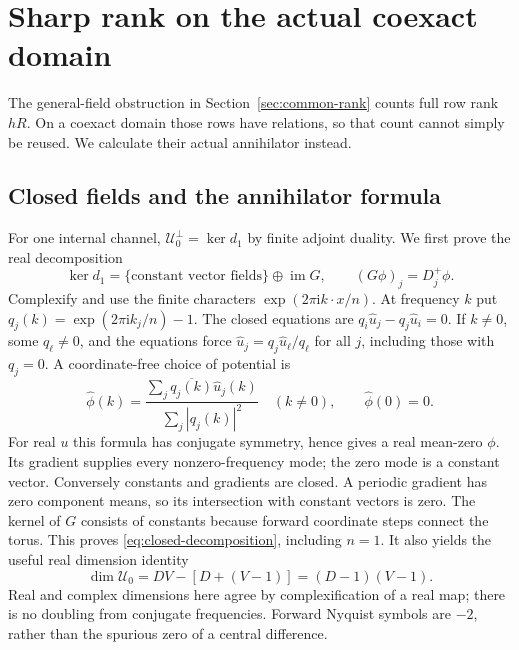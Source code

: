 \section{Sharp rank on the actual coexact domain}\label{sec:sharp-coexact}
The general-field obstruction in Section~\ref{sec:common-rank} counts full
row rank $hR$. On a coexact domain those rows have relations, so that count
cannot simply be reused. We calculate their actual annihilator instead.

\subsection{Closed fields and the annihilator formula}
For one internal channel, $\mathcal U_0^\perp=\ker d_1$ by finite
adjoint duality. We first prove the real decomposition
\begin{equation}\label{eq:closed-decomposition}
 \ker d_1=\{\text{constant vector fields}\}\oplus\operatorname{im}G,
 \qquad (G\phi)_j=D_j^+\phi.
\end{equation}
Complexify and use the finite characters
$\exp(2\pi\mathrm i k\cdot x/n)$. At frequency $k$ put
$q_j(k)=\exp(2\pi\mathrm i k_j/n)-1$. The closed equations are
$q_i\widehat u_j-q_j\widehat u_i=0$. If $k\ne0$, some $q_\ell\ne0$,
and the equations force $\widehat u_j=q_j\widehat u_\ell/q_\ell$ for
all $j$, including those with $q_j=0$. A coordinate-free choice of potential is
\[
 \widehat\phi(k)=
 \frac{\sum_j\overline{q_j(k)}\widehat u_j(k)}{\sum_j|q_j(k)|^2}
 \quad(k\ne0),\qquad \widehat\phi(0)=0.
\]
For real $u$ this formula has conjugate symmetry, hence gives a real
mean-zero $\phi$. Its gradient supplies every nonzero-frequency mode;
the zero mode is a constant vector. Conversely constants and gradients
are closed. A periodic gradient has zero component means, so its
intersection with constant vectors is zero. The kernel of $G$ consists
of constants because forward coordinate steps connect the torus.
This proves \eqref{eq:closed-decomposition}, including $n=1$.
It also yields the useful real dimension identity
\begin{equation}\label{eq:coexact-dimension}
 \dim\mathcal U_0=DV-[D+(V-1)]=(D-1)(V-1).
\end{equation}
Real and complex dimensions here agree by complexification of a real map;
there is no doubling from conjugate frequencies. Forward Nyquist symbols
are $-2$, rather than the spurious zero of a central difference.

